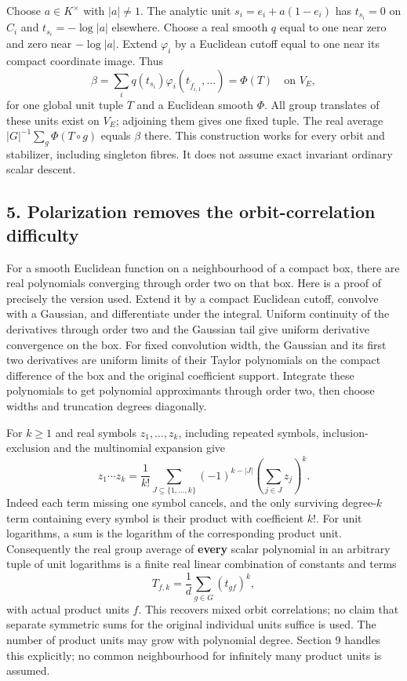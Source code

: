 \documentclass[
  11pt,
]{article}
\begin{document}
Choose \(a\in K^\times\) with \(|a|\ne1\). The analytic unit
\(s_i=e_i+a(1-e_i)\) has \(t_{s_i}=0\) on \(C_i\) and
\(t_{s_i}=-\log|a|\) elsewhere. Choose a real smooth \(q\) equal to one
near zero and zero near \(-\log|a|\). Extend \(\varphi_i\) by a
Euclidean cutoff equal to one near its compact coordinate image. Thus \[
 \beta=\sum_i q(t_{s_i})\varphi_i(t_{\widetilde f_{i,1}},\ldots)
                          =\Phi(T)\quad\text{on }V_E,   \tag{8}
\] for one global unit tuple \(T\) and a Euclidean smooth \(\Phi\). All
group translates of these units exist on \(V_E\); adjoining them gives
one fixed tuple. The real average \(|G|^{-1}\sum_g\Phi(T\circ g)\)
equals \(\beta\) there. This construction works for every orbit and
stabilizer, including singleton fibres. It does not assume exact
invariant ordinary scalar descent.

\subsection{5. Polarization removes the orbit-correlation
difficulty}\label{polarization-removes-the-orbit-correlation-difficulty}

For a smooth Euclidean function on a neighbourhood of a compact box,
there are real polynomials converging through order two on that box.
Here is a proof of precisely the version used. Extend it by a compact
Euclidean cutoff, convolve with a Gaussian, and differentiate under the
integral. Uniform continuity of the derivatives through order two and
the Gaussian tail give uniform derivative convergence on the box. For
fixed convolution width, the Gaussian and its first two derivatives are
uniform limits of their Taylor polynomials on the compact difference of
the box and the original coefficient support. Integrate these
polynomials to get polynomial approximants through order two, then
choose widths and truncation degrees diagonally.

For \(k\ge1\) and real symbols \(z_1,\ldots,z_k\), including repeated
symbols, inclusion-exclusion and the multinomial expansion give \[
 z_1\cdots z_k=\frac1{k!}\sum_{J\subseteq\{1,\ldots,k\}}
            (-1)^{k-|J|}\left(\sum_{j\in J}z_j\right)^k. \tag{9}
\] Indeed each term missing one symbol cancels, and the only surviving
degree-\(k\) term containing every symbol is their product with
coefficient \(k!\). For unit logarithms, a sum is the logarithm of the
corresponding product unit. Consequently the real group average of
\textbf{every} scalar polynomial in an arbitrary tuple of unit
logarithms is a finite real linear combination of constants and terms \[
        T_{f,k}=\frac1d\sum_{g\in G}(t_{gf})^k,          \tag{10}
\] with actual product units \(f\). This recovers mixed orbit
correlations; no claim that separate symmetric sums for the original
individual units suffice is used. The number of product units may grow
with polynomial degree. Section 9 handles this explicitly; no common
neighbourhood for infinitely many product units is assumed.
\end{document}
